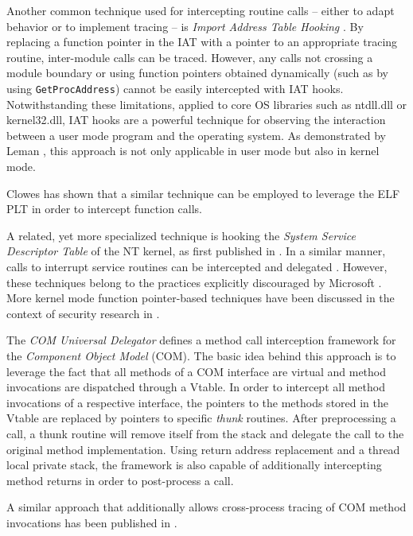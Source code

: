 Another common technique used for intercepting routine calls -- either to adapt behavior or
to implement tracing -- is \emph{Import Address Table Hooking} \cite{Robbins03}. 
By replacing a function pointer in the IAT with a pointer to an appropriate tracing
routine, inter-module calls can be traced. However, any calls not crossing a module 
boundary or using function pointers obtained dynamically (such as by using \verb|GetProcAddress|) cannot be 
easily intercepted with IAT hooks. Notwithstanding these limitations, 
applied to core OS libraries such as ntdll.dll or
kernel32.dll, IAT hooks are a powerful technique for observing the interaction between 
a user mode program and the operating system. As demonstrated by Leman \cite{Leman00}, this
approach is not only applicable in user mode but also in kernel mode. 

Clowes \cite{injectso} has shown that a similar technique can be employed to leverage the
ELF PLT in order to intercept function calls.

A related, yet more specialized technique is hooking the \emph{System Service Descriptor Table}
of the NT kernel, as first published in \cite{Russinovich97}. In a similar manner, calls to
interrupt service routines can be intercepted and delegated \citep{Hoglund05, UndocNT}. 
However, these techniques belong to the practices explicitly 
discouraged by Microsoft \cite{Microsoft07}. More
kernel mode function pointer-based techniques have been discussed in the context of 
security research in \cite{Skywing07}.

The \emph{COM Universal Delegator} \citep{Brown99_1, Brown99_2} defines a 
method call interception framework for the \emph{Component Object Model} (COM). 
The basic idea behind this approach is to leverage the fact that all
methods of a COM interface are virtual and method invocations are dispatched through a 
Vtable. In order to intercept all method invocations of a respective interface, the 
pointers to the methods stored in the Vtable are replaced by pointers to specific \emph{thunk} 
routines. After preprocessing a call, a thunk routine will remove itself from the stack
and delegate the call to the original method implementation. Using return address replacement
and a thread local private stack, the framework is also capable of additionally intercepting
method returns in order to post-process a call.

A similar approach that additionally allows cross-process tracing of COM method invocations 
has been published in \cite{Leman99}.

